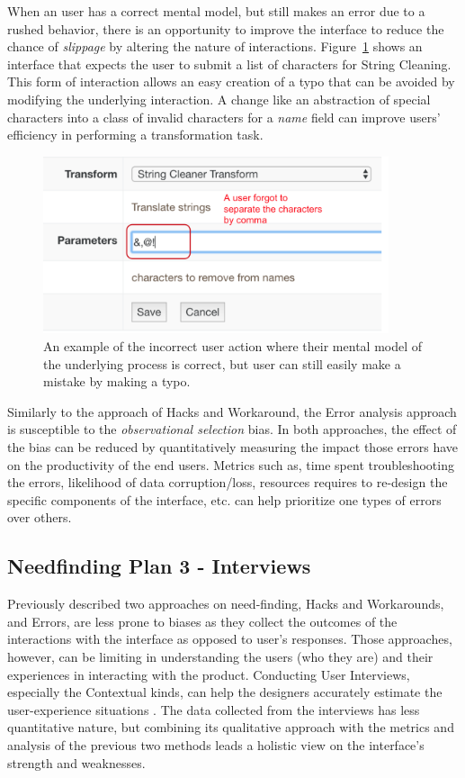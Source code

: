 \documentclass[12pt,letterpaper]{article}
\begin{document}
When an user has a correct mental model, but still makes an error due to a rushed behavior, there is an opportunity to improve the interface to reduce the chance of \textit{slippage} by altering the nature of interactions. Figure~\ref{fig::6} shows an interface that expects the user to submit a list of characters for String Cleaning. This form of interaction allows an easy creation of a typo that can be avoided by modifying the underlying interaction. A change like an abstraction of special characters into a class of invalid characters for a \textit{name} field can improve users' efficiency in performing a transformation task.

\begin{figure}[h]
\centering
\includegraphics[width=4in, scale=.3]{slip.png}
\caption{An example of the incorrect user action where their mental model of the underlying process is correct, but user can still easily make a mistake by making a typo.}
\label{fig::6}
\end{figure}

Similarly to the approach of Hacks and Workaround, the Error analysis approach is susceptible to the \textit{observational selection} bias. In both approaches, the effect of the bias can be reduced by quantitatively measuring the impact those errors have on the productivity of the end users. Metrics such as, time spent troubleshooting the errors, likelihood of data corruption/loss, resources requires to re-design the specific components of the interface, etc. can help prioritize one types of errors over others.  

\subsection*{Needfinding Plan 3 - Interviews}
Previously described two approaches on need-finding, Hacks and Workarounds, and Errors, are less prone to biases as they collect the outcomes of the interactions with the interface as opposed to user's responses. Those approaches, however, can be limiting in understanding the users (who they are) and their experiences in interacting with the product. Conducting User Interviews, especially the Contextual kinds, can help the designers accurately estimate the user-experience situations \cite{basics_ux_design}. The data collected from the interviews has less quantitative nature, but combining its qualitative approach with the metrics and analysis of the previous two methods leads a holistic view on the interface's strength and weaknesses.   
\end{document}
